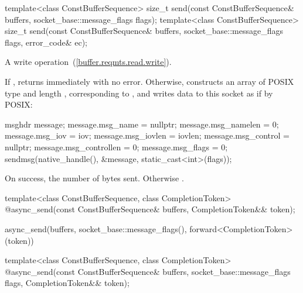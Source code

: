 \begin{itemdecl}
template<class ConstBufferSequence>
  size_t send(const ConstBufferSequence& buffers,
              socket_base::message_flags flags);
template<class ConstBufferSequence>
  size_t send(const ConstBufferSequence& buffers,
              socket_base::message_flags flags, error_code& ec);
\end{itemdecl}

\begin{itemdescr}
\pnum
A write operation~(\ref{buffer.reqmts.read.write}).

\pnum
\effects If , returns immediately with no error. Otherwise, constructs an array  of POSIX type  and length , corresponding to , and writes data to this socket as if by POSIX: 
\begin{codeblock}
msghdr message;
message.msg_name = nullptr;
message.msg_namelen = 0;
message.msg_iov = iov;
message.msg_iovlen = iovlen;
message.msg_control = nullptr;
message.msg_controllen = 0;
message.msg_flags = 0;
sendmsg(native_handle(), &message, static_cast<int>(flags));
\end{codeblock}


\pnum
\returns On success, the number of bytes sent. Otherwise .
\end{itemdescr}

\begin{itemdecl}
template<class ConstBufferSequence, class CompletionToken>
  @\DEDUCED@ async_send(const ConstBufferSequence& buffers, CompletionToken&& token);
\end{itemdecl}

\begin{itemdescr}
\pnum
\returns
\begin{codeblock}
async_send(buffers, socket_base::message_flags(), forward<CompletionToken>(token))
\end{codeblock}
\end{itemdescr}

\begin{itemdecl}
template<class ConstBufferSequence, class CompletionToken>
  @\DEDUCED@ async_send(const ConstBufferSequence& buffers,
                     socket_base::message_flags flags,
                     CompletionToken&& token);
\end{itemdecl}

